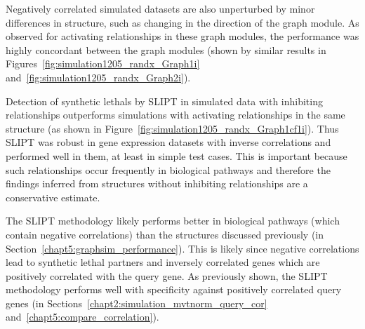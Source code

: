 Negatively correlated simulated datasets are also unperturbed by minor differences in  structure, such as changing in the direction of the graph module. As observed for activating relationships in these graph modules, the performance was highly concordant between the graph modules (shown by similar results in Figures~\ref{fig:simulation1205_randx_Graph1i} and~\ref{fig:simulation1205_randx_Graph2i}).

Detection of \glspl{synthetic lethal} by \gls{SLIPT} in simulated data with inhibiting relationships outperforms simulations with activating relationships in the same  structure (as shown in Figure~\ref{fig:simulation1205_randx_Graph1cf1i}). Thus \gls{SLIPT} was robust in \gls{gene expression} datasets with inverse correlations and performed well in them, at least in simple test cases. This is important because such relationships occur frequently in biological pathways and therefore the findings inferred from  structures without inhibiting relationships are a conservative estimate.

The \gls{SLIPT} methodology likely performs better in biological pathways (which contain negative correlations) than the  structures discussed previously (in Section~\ref{chapt5:graphsim_performance}). This is likely since negative correlations lead to \gls{synthetic lethal} partners and inversely correlated genes which are positively correlated with the query gene. As previously shown, the \gls{SLIPT} methodology performs well with specificity against positively correlated query genes (in Sections~\ref{chapt2:simulation_mvtnorm_query_cor} and~\ref{chapt5:compare_correlation}).%

